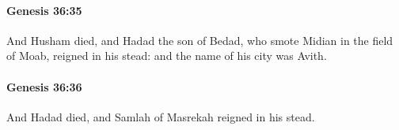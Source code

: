 		\paragraph{Genesis 36:35} %
			\label{GENESIS-36-35}

			And Husham died, and Hadad the son of Bedad, who smote Midian in the field of Moab, reigned in his stead: and the name of his city was Avith.


		\paragraph{Genesis 36:36} %
			\label{GENESIS-36-36}

			And Hadad died, and Samlah of Masrekah reigned in his stead.


